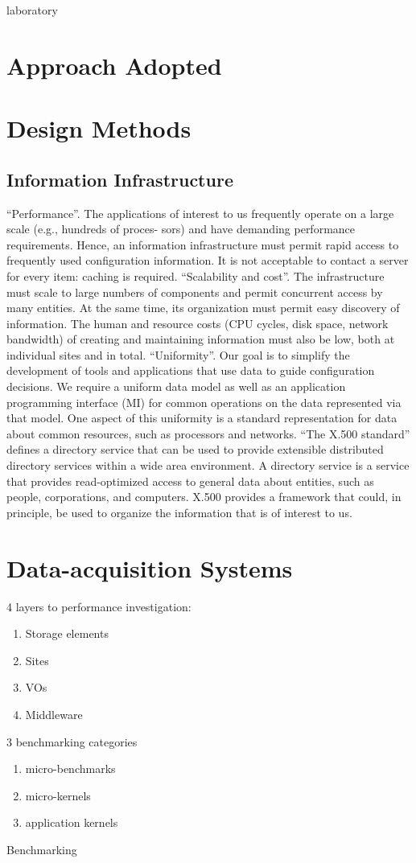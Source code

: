 laboratory

\section{Approach Adopted}

\section{Design Methods}

\subsection{Information Infrastructure}
``Performance''.  The applications of interest to us frequently 
operate on  a  large scale  (e.g.,  hundreds  of  proces- 
sors) and have demanding performance requirements. 
Hence, an information infrastructure must permit rapid 
access to frequently used configuration information. It 
is not acceptable to contact  a  server  for every  item: 
caching is required.
``Scalability and cost''. The infrastructure must scale to large
numbers of components and permit concurrent access
by many entities. At the same time, its organization
must permit easy discovery of information. The human
and resource costs (CPU cycles, disk space, network
bandwidth) of creating and maintaining information
must also be low, both at individual sites and in total.
``Uniformity''. Our goal is to simplify the development of
tools and applications that use data to guide configuration
decisions. We require a uniform data model
as well as an application programming interface (MI)
for common operations on the data represented via that
model. One aspect of this uniformity is a standard representation
for data about common resources, such as
processors and networks.
``The X.500 standard'' defines a directory service
that can be used to provide extensible distributed directory
services within a wide area environment. A directory service
is a service that provides read-optimized access to general
data about entities, such as people, corporations, and computers.
X.500 provides a framework that could, in principle,
be used to organize the information that is of interest to us.
\cite{mds1}


\section{Data-acquisition Systems}
4 layers to performance investigation:
\begin{enumerate}
  \item Storage elements
  \item Sites
  \item VOs
  \item Middleware
\end{enumerate}
3 benchmarking categories
\begin{enumerate}
  \item micro-benchmarks
  \item micro-kernels
  \item application kernels
\end{enumerate}
Benchmarking

